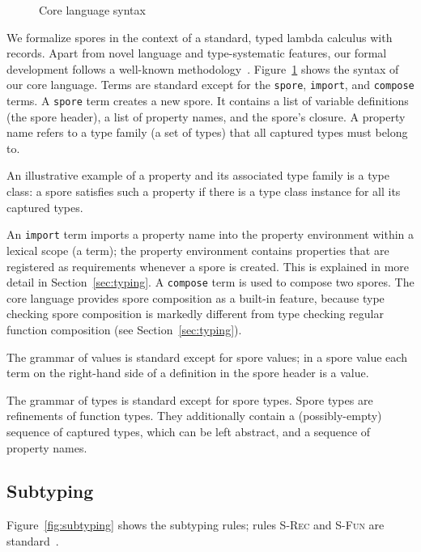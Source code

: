 \documentclass[runningheads]{llncs}
\begin{document}
\begin{sloppypar}
\begin{figure}[ht!]
  \caption{Core language syntax}
  \label{fig:syntax}
\end{figure}


We formalize spores in the context of a standard, typed lambda calculus with records. Apart from novel language and type-systematic features, our formal development follows a well-known methodology~\cite{TAPL}. Figure~\ref{fig:syntax} shows the syntax of our core language. Terms are standard except for the \texttt{spore}, \texttt{import}, and \texttt{compose} terms. A \texttt{spore} term creates a new spore. It contains a list of variable definitions (the spore header), a list of property names, and the spore's closure. A property name refers to a type family (a set of types) that all captured types must belong to.

An illustrative example of a property and its associated type family is a type class: a spore satisfies such a property if there is a type class instance for all its captured types.

An \texttt{import} term imports a property name into the property environment
within a lexical scope (a term); the property environment contains properties
that are registered as requirements whenever a spore is created. This is
explained in more detail in Section~\ref{sec:typing}. A \texttt{compose} term
is used to compose two spores. The core language provides spore composition as
a built-in feature, because type checking spore composition is markedly
different from type checking regular function composition (see
Section~\ref{sec:typing}).

The grammar of values is standard except for spore values; in a spore value each term on the right-hand side of a definition in the spore header is a value.

The grammar of types is standard except for spore types. Spore types are refinements of function types. They additionally contain a (possibly-empty) sequence of captured types, which can be left abstract, and a sequence of property names.

\subsection{Subtyping}\label{sec:subtyping}

Figure~\ref{fig:subtyping} shows the subtyping rules; rules \textsc{S-Rec} and \textsc{S-Fun} are standard~\cite{TAPL}.


\end{sloppypar}
\end{document}
